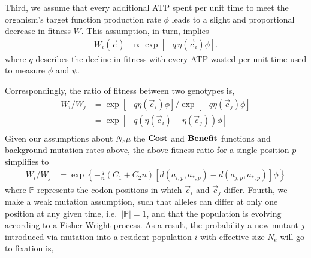 \documentclass{article}
\newcommand{\Cost}{\ensuremath{\text{\textbf{Cost}}}\xspace}
\newcommand{\Func}{\ensuremath{\text{\textbf{Benefit}}}\xspace}
\newcommand{\Ne}{\ensuremath{{N_e}}\xspace} %
\newcommand{\Nemu}{\ensuremath{{N_e \mu}}\xspace} %
\newcommand{\aip}{\ensuremath{a_{i,p}}\xspace}
\newcommand{\ajp}{\ensuremath{a_{j,p}}\xspace}
\newcommand{\aoptp}{\ensuremath{a_{*,p}}\xspace}
\newcommand{\cveci}{\ensuremath{\cvec_i}\xspace}
\newcommand{\cvecj}{\ensuremath{\cvec_j}\xspace}
\newcommand{\cvec}{\ensuremath{\Vec{c}}\xspace}
\newcommand{\kmax}{\ensuremath{{k_{\max}}}\xspace}
\newcommand{\setP}{\ensuremath{\mathbb{P}}\xspace}
\begin{document}
Third, we assume that every additional ATP spent per unit time to meet the organism's target function production rate $\phi$ leads to a slight and proportional decrease in fitness $W$.
This assumption, in turn, implies 
\begin{align}
  W_i\left(\cvec\right) &\propto \exp\left[- q \, \eta(\cveci) \phi\right].
\end{align}
where $q$ describes the decline in fitness with every ATP wasted per unit time used to measure $\phi$ and $\psi$.

Correspondingly, the ratio of fitness between two genotypes is,
\begin{align*}
  W_i/W_j &=  \exp\left[- q \eta(\cveci) \phi\right]/\exp\left[- q \eta(\cvecj) \phi\right]\\
  &=  \exp\left[- q \left(\eta(\cveci)- \eta(\cvecj)\right) \phi\right]\\
\end{align*}
Given our assumptions about $\Nemu$ the \Cost and \Func functions and background mutation rates above, the above fitness ratio for a single position $p$ simplifies to
\begin{align}
 W_i/W_j  &= \exp\left\{- \frac{q}{n} \left(C_1 + C_2 n\right) \left[d\left(\aip,\aoptp\right) - d\left(\ajp,\aoptp\right)\right] \phi \right\}
\end{align}
where \setP represents the codon positions in which \cveci and \cvecj differ.
Fourth, we make a weak mutation assumption, such that alleles can differ at only one position at any given time, i.e.~$|\setP| = 1$, and that the population is evolving according to a Fisher-Wright process.
As a result, the probability a new mutant $j$ introduced via mutation into a resident population $i$ with effective size \Ne will go to fixation is,
\end{document}
